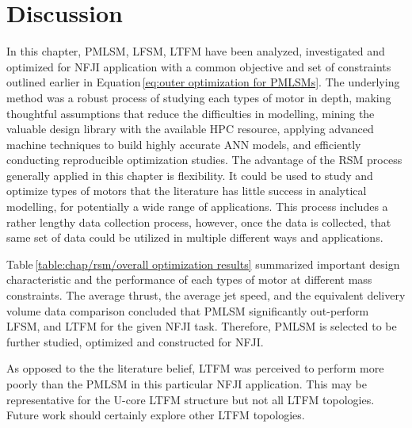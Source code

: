     \section{Discussion}                            \label{Chapter:RSM/discussion}
    
    
        In this chapter, \acf{PMLSM}, \acf{LFSM}, \acf{LTFM} have been analyzed, investigated and optimized for \acf{NFJI} application with a common objective and set of constraints outlined earlier in Equation\,\ref{eq:outer optimization for PMLSMs}. The underlying method was a robust process of studying each types of motor in depth, making thoughtful assumptions that reduce the difficulties in modelling, mining the valuable design library with the available \acf{HPC} resource, applying advanced machine techniques to build highly accurate \acf{ANN} models, and efficiently conducting reproducible optimization studies. The advantage of the \acf{RSM} process generally applied in this chapter is flexibility. It could be used to study and optimize types of motors that the literature has little success in analytical modelling, for potentially a wide range of applications. This process includes a rather lengthy data collection process, however, once the data is collected, that same set of data could be utilized in multiple different ways and applications.
        
        
        Table\,\ref{table:chap/rsm/overall optimization results} summarized important design characteristic and the performance of each types of motor at different mass constraints. The average thrust, the average jet speed, and the equivalent delivery volume data comparison concluded that \acs{PMLSM} significantly out-perform \acs{LFSM}, and \acs{LTFM} for the given \acs{NFJI} task. Therefore, \acs{PMLSM} is selected to be further studied, optimized and constructed for \acs{NFJI}. 
        
        
        As opposed to the the literature belief, \acs{LTFM} was perceived to perform more poorly than the \acs{PMLSM} in this  particular \acs{NFJI} application. This may be representative for the U-core \acs{LTFM} structure but not all \acs{LTFM} topologies. Future work should certainly explore other \acs{LTFM} topologies.
   
